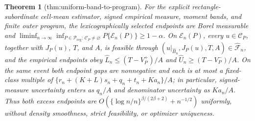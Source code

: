\documentclass{article}
\newtheorem{theorem}{Theorem}
\begin{document}
\begin{theorem}[thm:uniform-band-to-program]\label{thm:uniform-band-to-program}
For the explicit rectangle-subordinate cell-mean estimator, signed empirical measure, moment bands, and finite outer program, the lexicographically selected endpoints are Borel measurable and \(\liminf_{n\to\infty}\inf_{P\in\mathcal P_{\mathrm{reg}}:\,\mathcal C_P\neq\varnothing}P\{\mathcal E_n(P)\}\ge1-\alpha\). On \(\mathcal E_n(P)\), every \(u\in\mathcal C_P\), together with \(J_P(u)\), \(T\), and \(A\), is feasible through \((u|_{\widehat B_n},J_P(u),T,A)\in\widehat{\mathscr F}_n\), and the empirical endpoints obey \(\widehat L_n\le(T-V_P^+)/A\) and \(\widehat U_n\ge(T-V_P^-)/A\). On the same event both endpoint gaps are nonnegative and each is at most a fixed-class multiple of \(\{r_n+(K+L)s_n+q_n+t_n+Ka_n\}/A\); in particular, signed-measure uncertainty enters as \(q_n/A\) and denominator uncertainty as \(Ka_n/A\). Thus both excess endpoints are \(O(\{\log n/n\}^{\beta/(2\beta+2)}+n^{-1/2})\) uniformly, without density smoothness, strict feasibility, or optimizer uniqueness.
\end{theorem}
\end{document}
